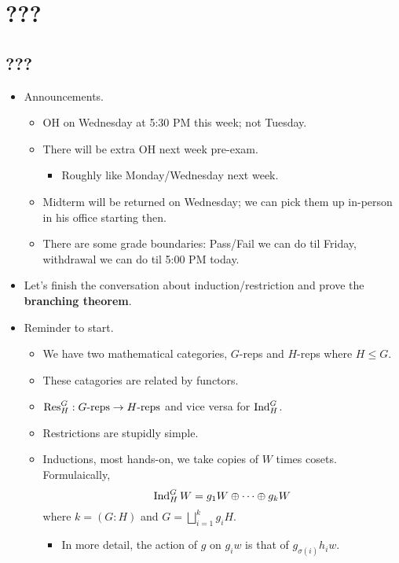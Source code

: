 \documentclass[../notes.tex]{subfiles}
\begin{document}
\chapter{???}
\section{???}
\begin{itemize}
    \item {}Announcements.
    \begin{itemize}
        \item OH on Wednesday at 5:30 PM this week; not Tuesday.
        \item There will be extra OH next week pre-exam.
        \begin{itemize}
            \item Roughly like Monday/Wednesday next week.
        \end{itemize}
        \item Midterm will be returned on Wednesday; we can pick them up in-person in his office starting then.
        \item There are some grade boundaries: Pass/Fail we can do til Friday, withdrawal we can do til 5:00 PM today.
    \end{itemize}
    \item Let's finish the conversation about induction/restriction and prove the \textbf{branching theorem}.
    \item Reminder to start.
    \begin{itemize}
        \item We have two mathematical categories, $G$-reps and $H$-reps where $H\leq G$.
        \item These catagories are related by functors.
        \item $\operatorname{Res}_H^G:G\text{-reps}\to H\text{-reps}$ and vice versa for $\operatorname{Ind}_H^G$.
        \item Restrictions are stupidly simple.
        \item Inductions, most hands-on, we take copies of $W$ times cosets. Formulaically,
        \begin{equation*}
            \operatorname{Ind}_H^GW = g_1W\oplus\cdots\oplus g_kW
        \end{equation*}
        where $k=(G:H)$ and $G=\bigsqcup_{i=1}^kg_iH$.
        \begin{itemize}
            \item In more detail, the action of $g$ on $g_iw$ is that of $g_{\sigma(i)}h_iw$.

\end{itemize}
\end{itemize}
\end{itemize}
\end{document}
